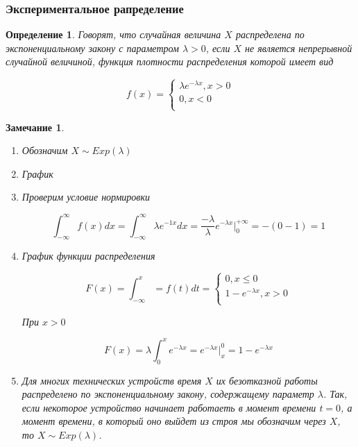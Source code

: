 \documentclass[a4paper, 14pt]{report}
\newtheorem{defenition}{Определение}[section]
\newtheorem{note}{Замечание}[section]
\begin{document}
\subsubsection{Экспериментальное рапределение}

\begin{defenition}
    Говорят, что случайная величина $X$ распределена по экспоненциальному закону с параметром $\lambda > 0$, если $X$ не является непрерывной случайной величиной, функция плотности распределения которой имеет вид

    $$
    f(x) =
    \begin{cases}
        \lambda e^{-\lambda x}, x > 0 \\
        0, x < 0 \\
    \end{cases}
    $$
\end{defenition}

\begin{note}
    \begin{enumerate}
        \item Обозначим $X \sim Exp(\lambda)$
        \item График
        \item Проверим условие нормировки

            $$
            \int_{-\infty}^{\infty} f(x) dx = \int_{-\infty}^\infty \lambda e^{-1x} dx = \frac{-\lambda}{\lambda} e^{-\lambda x} |_{0}^{+\infty} = -(0-1) = 1
            $$

        \item График функции распределения

            $$
            F(x) = \int_{-\infty}^x = f(t)dt =
            \begin{cases}
                0, x \le 0 \\
                1 - e^{-\lambda x}, x > 0 \\
            \end{cases}
            $$

            При $x > 0$

            $$
            F(x) = \lambda \int_0^x e^{-\lambda x} = e^{-\lambda x}|_x^0 = 1 - e^{-\lambda x}
            $$

        \item Для многих технических устройств время $X$ их безотказной работы распределено по экспоненциальному закону, содержащему параметр $\lambda$. Так, если некоторое устройство начинает работаеть в момент времени $t=0$, а момент времени, в который оно выйдет из строя мы обозначим через $X$, то $X \sim Exp(\lambda)$.
    \end{enumerate}
\end{note}
\end{document}
